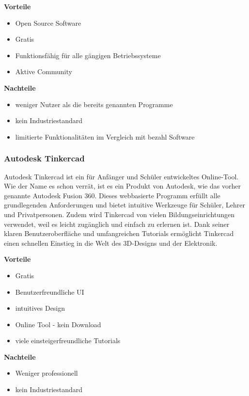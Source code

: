 \textbf{Vorteile}
\begin{itemize}
	\item Open Source Software
	\item Gratis
	\item Funktionsfähig für alle gängigen Betriebssysteme
	\item Aktive Community	 
\end{itemize}

\textbf{Nachteile}
\begin{itemize}
	\item weniger Nutzer als die bereits genannten Programme
	\item kein Industriestandard
	\item limitierte Funktionalitäten im Vergleich mit bezahl Software
\end{itemize}
\cite{FreeCADReviews}

\subsubsection{Autodesk Tinkercad}
Autodesk Tinkercad ist ein für Anfänger und Schüler entwickeltes Online-Tool. Wie der Name es schon verrät, ist es ein Produkt von Autodesk, wie das vorher genannte Autodesk Fusion 360. Dieses webbasierte Programm erfüllt alle grundlegenden Anforderungen und bietet intuitive Werkzeuge für Schüler, Lehrer und Privatpersonen. Zudem wird Tinkercad von vielen Bildungseinrichtungen verwendet, weil es leicht zugänglich und einfach zu erlernen ist. Dank seiner klaren Benutzeroberfläche und umfangreichen Tutorials ermöglicht Tinkercad einen schnellen Einstieg in die Welt des 3D-Designs und der Elektronik. \\
\cite{Tinkercad}

\textbf{Vorteile}
\begin{itemize}
	\item Gratis
	\item Benutzerfreundliche UI
	\item intuitives Design
	\item Online Tool - kein Download 	
	\item viele einsteigerfreundliche Tutorials 
\end{itemize}

\textbf{Nachteile}
\begin{itemize}
	\item Weniger professionell
	\item kein Industriestandard 
\end{itemize}
\cite{TinkercadReviews}

